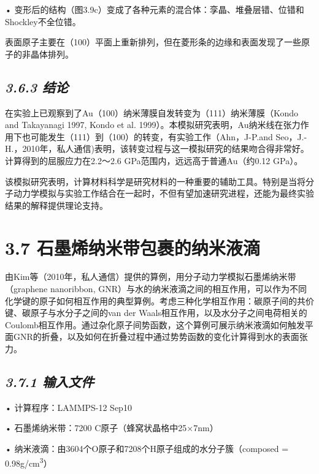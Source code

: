 •
变形后的结构（图3.9c）变成了各种元素的混合体：孪晶、堆叠层错、位错和Shockley不全位错。

表面原子主要在（100）平面上重新排列，但在菱形条的边缘和表面发现了一些原子的非晶体排列。

\hypertarget{ux7ed3ux8bba}{%
\subsection{\texorpdfstring{\emph{3.6.3
结论}}{3.6.3 结论}}\label{ux7ed3ux8bba}}

在实验上已观察到了Au（100）纳米薄膜自发转变为（111）纳米薄膜（Kondo and
Takayanagi 1997, Kondo et al.
1999）。本模拟研究表明，Au纳米线在张力作用下也可能发生（111）到（100）的转变，有实验工作（Ahn，J-P.and
Seo，J.-H.，2010年，私人通信)表明，该转变过程与这一模拟研究的结果吻合得非常好。计算得到的屈服应力在2.2～2.6
GPa范围内，远远高于普通Au（约0.12 GPa）。

该模拟研究表明，计算材料科学是研究材料的一种重要的辅助工具。特别是当将分子动力学模拟与实验工作结合在一起时，不但有望加速研究进程，还能为最终实验结果的解释提供理论支持。

\hypertarget{ux77f3ux58a8ux70efux7eb3ux7c73ux5e26ux5305ux88f9ux7684ux7eb3ux7c73ux6db2ux6ef4}{%
\section{3.7
石墨烯纳米带包裹的纳米液滴}\label{ux77f3ux58a8ux70efux7eb3ux7c73ux5e26ux5305ux88f9ux7684ux7eb3ux7c73ux6db2ux6ef4}}

由Kim等（2010年，私人通信）提供的算例，用分子动力学模拟石墨烯纳米带（graphene
nanoribbon,
GNR）与水的纳米液滴之间的相互作用，可以作为不同化学键的原子如何相互作用的典型算例。考虑三种化学相互作用：碳原子间的共价键、碳原子与水分子之间的van
der
Waals相互作用，以及水分子之间电荷相关的Coulomb相互作用。通过杂化原子间势函数，这个算例可展示纳米液滴如何触发平面GNR的折叠，以及如何在折叠过程中通过势势函数的变化计算得到水的表面张力。

\hypertarget{ux8f93ux5165ux6587ux4ef6-5}{%
\subsection{\texorpdfstring{\emph{3.7.1
输入文件}}{3.7.1 输入文件}}\label{ux8f93ux5165ux6587ux4ef6-5}}

• 计算程序：LAMMPS-12 Sep10

• 石墨烯纳米带：7200 C原子（蜂窝状晶格中25×7nm）

• 纳米液滴：由3604个O原子和7208个H原子组成的水分子簇（composed =
0.98g/cm\textsuperscript{3}）

